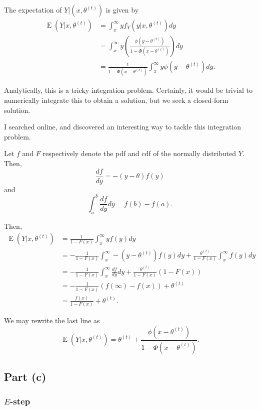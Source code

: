 \documentclass[
]{article}
\begin{document}
The expectation of \(Y|(x,\theta^{(t)})\) is given by \begin{align}
  \operatorname{E}(Y|x,\theta^{(t)})
    &= \int_{x}^{\infty} y f_{Y}(y|x,\theta^{(t)}) dy\\
    &= \int_{x}^{\infty} y \left(\frac{\phi(y - \theta^{(t)})}{1 - \Phi(x - \theta^{(t)})}\right) dy\\
    &= \frac{1}{{1 - \Phi(x - \theta^{(t)})}}\int_{x}^{\infty} y \phi(y - \theta^{(t)}) dy.
\end{align}

Analytically, this is a tricky integration problem. Certainly, it would
be trivial to numerically integrate this to obtain a solution, but we
seek a closed-form solution.

I searched online, and discovered an interesting way to tackle this
integration problem.

Let \(f\) and \(F\) respectively denote the pdf and cdf of the normally
distributed \(Y\). Then, \[
  \frac{df}{dy} = -(y - \theta) f(y)
\] and \[
  \int_{a}^{b} \frac{df}{dy} dy = f(b) - f(a).
\]

Then, \begin{align}
  \operatorname{E}(Y|x,\theta^{(t)})
    &= \frac{1}{1 - F(x)}\int_{x}^{\infty} y f(y) dy\\
    &= -\frac{1}{1 - F(x)}\int_{x}^{\infty} - (y -\theta^{(t)}) f(y) dy + \frac{\theta^{(t)}}{1-F(x)}\int_{x}^{\infty} f(y) dy\\
    &= -\frac{1}{1 - F(x)}\int_{x}^{\infty} \frac{df}{dy} dy + \frac{\theta^{(t)}}{1-F(x)} (1-F(x))\\
    &= -\frac{1}{1 - F(x)}\left(f(\infty) - f(x)\right) + \theta^{(t)}\\
    &= \frac{f(x)}{1 - F(x)} + \theta^{(t)}.
\end{align}

We may rewrite the last line as \[
  \operatorname{E}(Y|x,\theta^{(t)}) = \theta^{(t)} + \frac{\phi(x-\theta^{(t)})}{1 - \Phi(x-\theta^{(t)})}.
\]

\hypertarget{part-c}{%
\subsection{Part (c)}\label{part-c}}


\hypertarget{e-step}{%
\subsubsection{\texorpdfstring{\(E\)-step}{E-step}}\label{e-step}}
\end{document}
